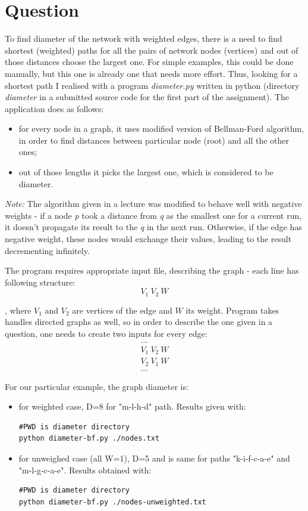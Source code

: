 \documentclass[paper=a4, fontsize=11pt]{scrartcl} %
\numberwithin{equation}{section} %
\numberwithin{figure}{section} %
\numberwithin{table}{section} %
\begin{document}
\section{Question}
To find diameter of the network with weighted edges, there is a need to find shortest (weighted) paths for all the pairs of network nodes (vertices) and out of those distances choose the largest one. For simple examples, this could be done manually, but this one is already one that needs more effort. Thus, looking for a shortest path I realised with a program \textit{diameter.py} written in python (directory \textit{diameter} in a submitted source code for the first part of the assignment). The application does as follows:
\begin{itemize}
\item for every node in a graph, it uses modified version of Bellman-Ford algorithm, in order to find distances between particular node (root) and all the other ones;
\item out of those lengths it picks the largest one, which is considered to be diameter.
\end{itemize}
\textit{Note:} The algorithm given in a lecture was modified to behave well with negative weights - if a node \textit{p} took a distance from \textit{q} as the smallest one for a current run, it doesn't propagate its result to the \textit{q} in the next run. Otherwise, if the edge has negative weight, these nodes would exchange their values, leading to the result decrementing infinitely. 

The program requires appropriate input file, describing the graph - each line has following structure:
\begin{equation}
V_1 \ V_2 \ W
\end{equation}

, where $V_1$ and $V_2$ are vertices of the edge and $W$ its weight. Program takes handles directed graphs as well, so in order to describe the one given in a question, one needs to create two inputs for every edge:
\begin{equation}
\begin{matrix}
... \\
V_1 \ V_2 \ W \\
V_2 \ V_1 \ W \\
...
\end{matrix}
\end{equation}

For our particular example, the graph diameter is:
\begin{itemize}
\item for weighted case, D=8 for "m-l-h-d" path. Results given with:
\begin{lstlisting}
#PWD is diameter directory
python diameter-bf.py ./nodes.txt
\end{lstlisting}
\item for unweighed case (all W=1), D=5 and is same for paths "k-i-f-c-a-e" and "m-l-g-c-a-e". Results obtained with:
\begin{lstlisting}
#PWD is diameter directory
python diameter-bf.py ./nodes-unweighted.txt
\end{lstlisting}
\end{itemize}
\end{document}
